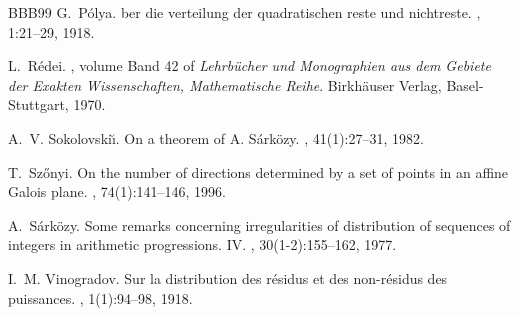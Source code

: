 \documentclass[a4paper, 12pt]{article}
\theoremstyle{definition}
\begin{document}
\begin{thebibliography}{BBB{\etalchar{+}}99}
G.~P{\'o}lya.
ber die verteilung der quadratischen reste und nichtreste.
, 1:21--29, 1918.

L.~Rédei.
, volume Band 42 of {\em Lehrb\"{u}cher und Monographien aus dem Gebiete der Exakten Wissenschaften, Mathematische Reihe}.
\newblock Birkh\"{a}user Verlag, Basel-Stuttgart, 1970.

A.~V. Sokolovski\u{\i}.
\newblock On a theorem of {A}. {S}\'{a}rk\"{o}zy.
, 41(1):27--31, 1982.

T.~Sz{\H{o}}nyi.
\newblock On the number of directions determined by a set of points in an affine {G}alois plane.
, 74(1):141--146, 1996.

A.~Sárk\"{o}zy.
\newblock Some remarks concerning irregularities of distribution of sequences of integers in arithmetic progressions. {IV}.
, 30(1-2):155--162, 1977.

I.~M. Vinogradov.
\newblock Sur la distribution des r{\'e}sidus et des non-r{\'e}sidus des puissances.
, 1(1):94--98, 1918.

\end{thebibliography}
\end{document}
